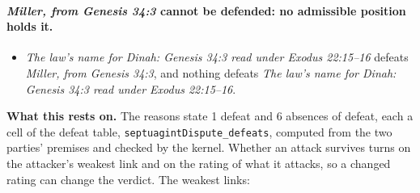 \documentclass[11pt]{article}
\begin{document}
\paragraph{\emph{Miller, from Genesis 34:3} cannot be defended: no admissible position holds it.}
\begin{itemize}
\item \emph{The law’s name for Dinah: Genesis 34:3 read under Exodus 22:15–16} defeats \emph{Miller, from Genesis 34:3}, and nothing defeats \emph{The law’s name for Dinah: Genesis 34:3 read under Exodus 22:15–16}.
\end{itemize}
\par\noindent\textbf{What this rests on.} The reasons state 1 defeat and 6 absences of defeat, each a cell of the defeat table, \texttt{septuagint\allowbreak{}Dispute\_\allowbreak{}defeats}, computed from the two parties' premises and checked by the kernel. Whether an attack survives turns on the attacker's weakest link and on the rating of what it attacks, so a changed rating can change the verdict. The weakest links:
\end{document}
